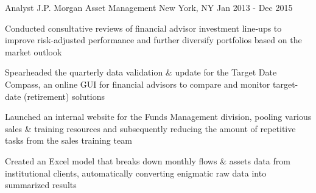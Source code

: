 \begin{cventries}
  \cventry
    {Analyst} %
    {J.P. Morgan Asset Management} %
    {New York, NY} %
    {Jan 2013 - Dec 2015} %
    {
      \begin{cvitems} %
        \item {Conducted consultative reviews of financial advisor investment line-ups to improve risk-adjusted performance and further diversify portfolios based on the market outlook}
        \item {Spearheaded the quarterly data validation \& update for the Target Date Compass, an online GUI for financial advisors to compare and monitor target-date (retirement) solutions}
        \item {Launched an internal website for the Funds Management division, pooling various sales \& training resources and subsequently reducing the amount of repetitive tasks from the sales training team}
        \item {Created an Excel model that breaks down monthly flows \& assets data from institutional clients, automatically converting enigmatic raw data into summarized results}
      \end{cvitems}
    }

\end{cventries}